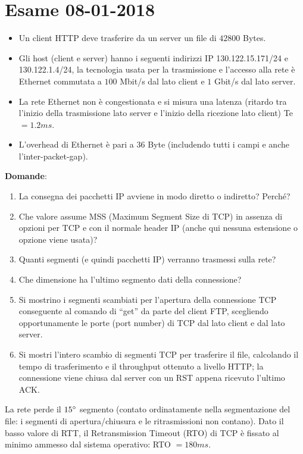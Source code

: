 \documentclass[10pt,a4paper]{article}
\begin{document}
	\newpage

	\section{Esame 08-01-2018}
	\begin{itemize}
		\item Un client HTTP deve trasferire da un server un file di $42800$ Bytes. 
		\item Gli host (client e server) hanno i seguenti indirizzi IP 130.122.15.171/24 e 130.122.1.4/24, la tecnologia usata per la trasmissione e l'accesso alla rete è Ethernet commutata a $100$ Mbit/s dal lato client e $1$ Gbit/s dal lato server. 
		\item La rete Ethernet non è congestionata e si misura una latenza (ritardo tra l'inizio della trasmissione lato server e l'inizio della ricezione lato client) Te $= 1.2 ms$. 
		\item L'overhead di Ethernet è pari a $36$ Byte (includendo tutti i campi e anche l'inter-packet-gap).
	\end{itemize}
	\textbf{Domande}:
	\begin{enumerate}
		\item La consegna dei pacchetti IP avviene in modo diretto o indiretto? Perché?
		\item Che valore assume MSS (Maximum Segment Size di TCP) in assenza di opzioni per TCP e con il normale header IP (anche qui nessuna estensione o opzione viene usata)?
		\item Quanti segmenti (e quindi pacchetti IP) verranno trasmessi sulla rete?
		\item Che dimensione ha l'ultimo segmento dati della connessione?
		\item Si mostrino i segmenti scambiati per l'apertura della connessione TCP conseguente al comando di “get” da parte del client FTP, scegliendo opportunamente le porte (port number) di TCP dal lato client e dal lato server.
		\item Si mostri l'intero scambio di segmenti TCP per trasferire il file, calcolando il tempo di trasferimento e il throughput ottenuto a livello HTTP; la connessione viene chiusa dal server con un RST appena ricevuto l'ultimo ACK.
	\end{enumerate}
	La rete perde il $15 \degree$ segmento (contato ordinatamente nella segmentazione del file: i segmenti di apertura/chiusura e le ritrasmissioni non contano). Dato il basso valore di RTT, il Retransmission Timeout (RTO) di TCP è fissato al minimo ammesso dal sistema operativo: RTO $=180ms$.
\end{document}
